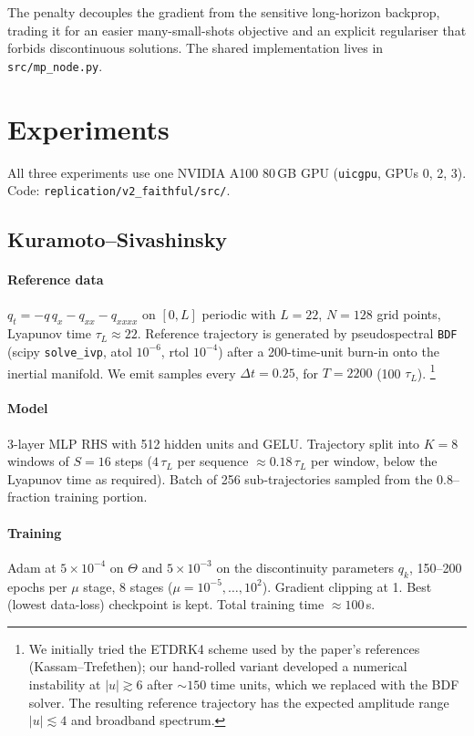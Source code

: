 \documentclass[11pt]{article}
\begin{document}
The penalty decouples the gradient from the sensitive long-horizon
backprop, trading it for an easier many-small-shots objective and an
explicit regulariser that forbids discontinuous solutions. The shared
implementation lives in \texttt{src/mp\_node.py}.

\section{Experiments}

All three experiments use one NVIDIA A100 80\,GB GPU (\texttt{uicgpu},
GPUs 0, 2, 3). Code: \texttt{replication/v2\_faithful/src/}.

\subsection{Kuramoto--Sivashinsky}

\paragraph{Reference data} $q_t = -q\,q_x - q_{xx} - q_{xxxx}$ on
$[0, L]$ periodic with $L=22$, $N=128$ grid points, Lyapunov time
$\tau_L\approx 22$. Reference trajectory is generated by pseudospectral
\texttt{BDF} (scipy \texttt{solve\_ivp}, atol $10^{-6}$, rtol
$10^{-4}$) after a 200-time-unit burn-in onto the inertial manifold.
We emit samples every $\Delta t = 0.25$, for $T = 2200$ (100 $\tau_L$).
\footnote{We initially tried the ETDRK4 scheme used by the
paper's references (Kassam--Trefethen); our hand-rolled variant
developed a numerical instability at $|u|\gtrsim 6$ after $\sim 150$
time units, which we replaced with the BDF solver. The resulting
reference trajectory has the expected amplitude range
$|u|\lesssim 4$ and broadband spectrum.}

\paragraph{Model} 3-layer MLP RHS with 512 hidden units and GELU.
Trajectory split into $K = 8$ windows of $S = 16$ steps ($4\,\tau_L$
per sequence $\approx 0.18\,\tau_L$ per window, below the Lyapunov
time as required).  Batch of 256 sub-trajectories sampled from the
$0.8$--fraction training portion.

\paragraph{Training} Adam at $5\times 10^{-4}$ on $\Theta$ and
$5\times 10^{-3}$ on the discontinuity parameters $q_k$, 150--200
epochs per $\mu$ stage, 8 stages ($\mu = 10^{-5},\ldots,10^2$).
Gradient clipping at 1. Best (lowest data-loss) checkpoint is kept.
Total training time $\approx 100$\,s.
\end{document}

